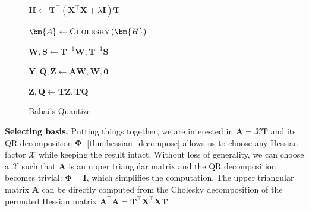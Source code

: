 \documentclass{article} %
\begin{document}
\begin{figure}
\vspace{-1.5em}
\centering
\begin{minipage}[t]{\linewidth}
\IncMargin{1.5em}
\begin{algorithm}[H]
\caption{Babai's Quantize}
\label{alg:babai_quantize}
\LinesNumbered
{}


$\bm{H} \leftarrow \bm{T}^\top \left( \bm{X}^\top \bm{X} + \lambda \mathbf{I} \right) \bm{T}$

$\bm{A} \leftarrow \textsc{Cholesky} \left( \bm{H} \right)^\top$

$\bm{W}, \bm{S} \leftarrow \bm{T}^{-1} \bm{W}, \bm{T}^{-1} \bm{S}$

$\bm{Y}, \bm{Q}, \bm{Z} \leftarrow \bm{A} \bm{W}, \bm{W}, \bm{0}$


$\bm{Z}, \bm{Q} \leftarrow \bm{T} \bm{Z}, \bm{T} \bm{Q}$

\end{algorithm}
\end{minipage}
\vspace{-1.5em}
\end{figure}

\textbf{Selecting basis.}
Putting things together, we are interested in $\bm{A} = \bm{\mathcal{X}} \bm{T}$ and its QR decomposition $\bm{\Phi}$. \cref{thm:hessian_decompose} allows us to choose any Hessian factor $\bm{\mathcal{X}}$ while keeping the result intact. Without loss of generality, we can choose a $\bm{\mathcal{X}}$ such that $\bm{A}$ is an upper triangular matrix and the QR decomposition becomes trivial: $\bm{\Phi} = \mathbf{I}$, which simplifies the computation. The upper triangular matrix $\bm{A}$ can be directly computed from the Cholesky decomposition of the permuted Hessian matrix $\bm{A}^\top \bm{A} = \bm{T}^\top \bm{X}^\top \bm{X} \bm{T}$.
\end{document}
